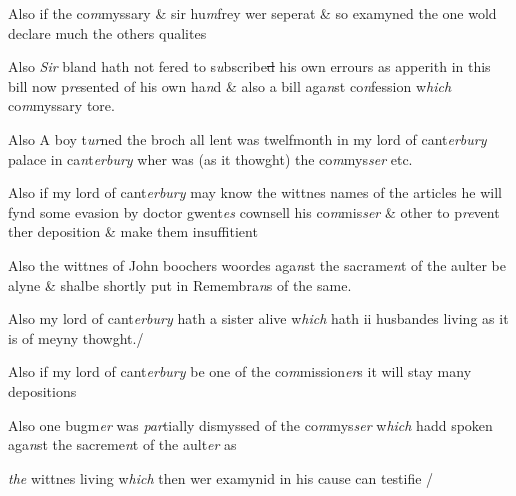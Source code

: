 \documentclass[12pt, a4paper]{book}
\begin{document}
		\ifthenelse{\isodd{\thepage}}
		{\reversemarginpar}
		{\normalmarginpar}
		Also if the co\textit{m}myssary \& sir hu\textit{m}frey wer seperat \& so examyned the one wold declare
much the others qualites
            		
		\ifthenelse{\isodd{\thepage}}
		{\reversemarginpar}
		{\normalmarginpar}
		Also \textit{Sir} bland hath not fered to s\textit{u}bscribe\sout{d} his own errours as apperith in this bill
now p\textit{re}sented of his own ha\textit{n}d \& also a bill aga\textit{n}st co\textit{n}fession w\textit{hich} co\textit{m}myssary tore.
            		
		\ifthenelse{\isodd{\thepage}}
		{\reversemarginpar}
		{\normalmarginpar}
		Also A boy t\textit{ur}ned the broch all lent was twelfmonth in my lord of cant\textit{erbury} palace
in ca\textit{n}t\textit{erbury} wher was (as it thowght) the co\textit{m}mys\textit{ser} etc. 
            		
		\ifthenelse{\isodd{\thepage}}
		{\reversemarginpar}
		{\normalmarginpar}
		Also if my lord of cant\textit{erbury} may know the wittnes names of the articles he will fynd
some evasion by doctor gwent\textit{es} cownsell his co\textit{m}mis\textit{ser} \& other to p\textit{re}vent ther
deposition \& make them insuffitient
            		
		\ifthenelse{\isodd{\thepage}}
		{\reversemarginpar}
		{\normalmarginpar}
		Also the wittnes of John boochers woordes aga\textit{n}st the sacrame\textit{n}t of the aulter be 
alyne \& shalbe shortly put in Remembra\textit{n}s of the same.
            		
		\ifthenelse{\isodd{\thepage}}
		{\reversemarginpar}
		{\normalmarginpar}
		Also my lord of cant\textit{erbury} hath a sister alive w\textit{hich} hath ii husbandes living as it is
			 of
meyny thowght./
            		
		\ifthenelse{\isodd{\thepage}}
		{\reversemarginpar}
		{\normalmarginpar}
		Also if my lord of cant\textit{erbury} be one of the co\textit{m}mission\textit{er}s it will stay many depositions
            		
		\ifthenelse{\isodd{\thepage}}
		{\reversemarginpar}
		{\normalmarginpar}
		Also one bugm\textit{er} was\textit{ par}tially dismyssed of the co\textit{m}mys\textit{ser} w\textit{hich} hadd spoken aga\textit{n}st the sacreme\textit{n}t
of the ault\textit{er} as \textit{}
               
                  \textit{the}
			wittnes living w\textit{hich} then wer examynid in his cause can testifie /
\end{document}
